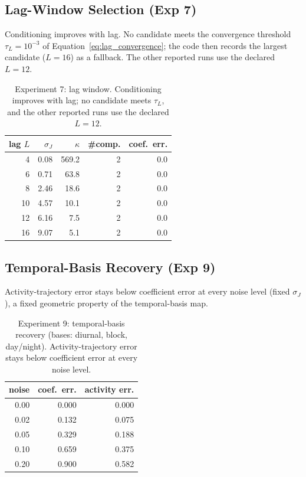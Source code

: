 \subsection{Lag-Window Selection (Exp 7)}
\label{subsec:results_lag_selection}
Conditioning improves with lag.  No candidate meets the convergence threshold
$\tau_L=10^{-3}$ of Equation~\ref{eq:lag_convergence}; the code then records the largest
candidate ($L=16$) as a fallback.  The other reported runs use the declared $L=12$.
\begin{table}[t]
\centering
\footnotesize
\caption{Experiment 7: lag window.  Conditioning improves with lag; no candidate meets
$\tau_L$, and the other reported runs use the declared $L=12$.}
\label{tab:results_lag}
\begin{tabular}{rrrrr}
\toprule
lag $L$ & $\sigma_J$ & $\kappa$ & \#comp. & coef.\ err. \\
\midrule
4  & 0.08 & 569.2 & 2 & 0.0 \\
6  & 0.71 & 63.8  & 2 & 0.0 \\
8  & 2.46 & 18.6  & 2 & 0.0 \\
10 & 4.57 & 10.1  & 2 & 0.0 \\
12 & 6.16 & 7.5   & 2 & 0.0 \\
16 & 9.07 & 5.1   & 2 & 0.0 \\
\bottomrule
\end{tabular}
\end{table}

\subsection{Temporal-Basis Recovery (Exp 9)}
\label{subsec:results_temporal_basis}
Activity-trajectory error stays below coefficient error at every noise level (fixed
$\sigma_J$), a fixed geometric property of the temporal-basis map.
\begin{table}[t]
\centering
\footnotesize
\caption{Experiment 9: temporal-basis recovery (bases: diurnal, block, day/night).
Activity-trajectory error stays below coefficient error at every noise level.}
\label{tab:results_temporal}
\begin{tabular}{rrr}
\toprule
noise & coef.\ err. & activity err. \\
\midrule
0.00 & 0.000 & 0.000 \\
0.02 & 0.132 & 0.075 \\
0.05 & 0.329 & 0.188 \\
0.10 & 0.659 & 0.375 \\
0.20 & 0.900 & 0.582 \\
\bottomrule
\end{tabular}
\end{table}

